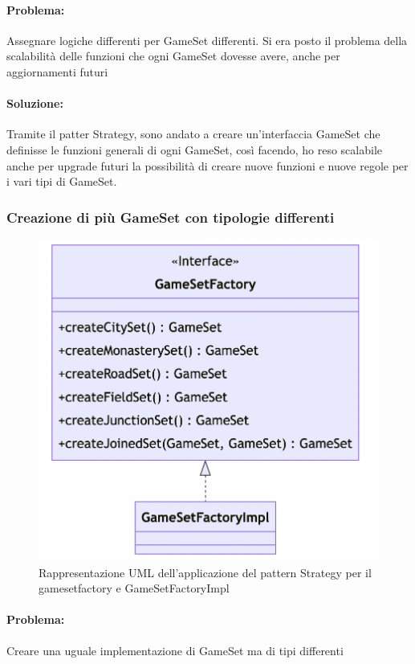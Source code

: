 \paragraph{Problema:}
Assegnare logiche differenti per GameSet differenti. Si era posto il problema della scalabilità delle funzioni che ogni GameSet dovesse avere, anche per aggiornamenti futuri
\paragraph{Soluzione:}
Tramite il patter Strategy, sono andato a creare un'interfaccia GameSet che definisse le funzioni generali di ogni GameSet, così facendo, ho reso scalabile anche per upgrade futuri la possibilità di creare nuove funzioni e nuove regole per i vari tipi di GameSet.
\clearpage

\subsubsection*{Creazione di più GameSet con tipologie differenti}
\begin{figure}[ht]
    \centering\includegraphics[scale=.3]{images/gamesetfactory.png}
    \caption{Rappresentazione UML dell'applicazione del pattern Strategy per il gamesetfactory e GameSetFactoryImpl}
\end{figure}

\paragraph{Problema:}
Creare una uguale implementazione di GameSet ma di tipi differenti
